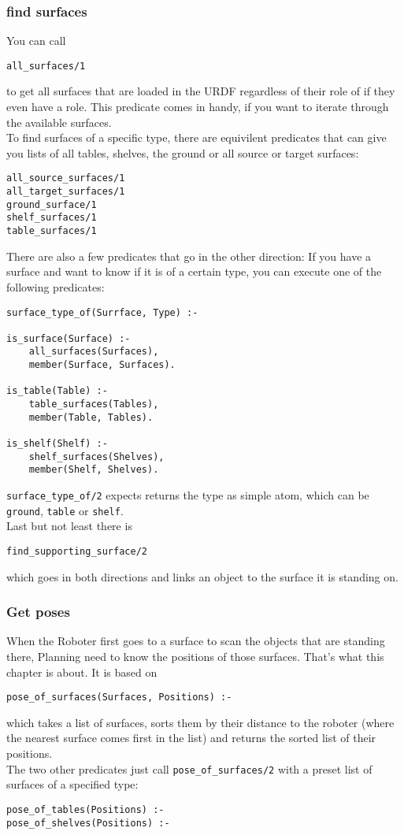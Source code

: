 \documentclass[main.tex]{subfiles}
\begin{document}
\subsubsection{find surfaces}

You can call
\begin{lstlisting}
all_surfaces/1
\end{lstlisting}
to get all surfaces that are loaded in the URDF regardless of their role of if they even have a role. This predicate comes in handy, if you want to iterate through the available surfaces.\\
To find surfaces of a specific type, there are equivilent predicates that can give you lists of all tables, shelves, the ground or all source or target surfaces:
\begin{lstlisting}
all_source_surfaces/1
all_target_surfaces/1
ground_surface/1
shelf_surfaces/1
table_surfaces/1
\end{lstlisting}

There are also a few predicates that go in the other direction: If you have a surface and want to know if it is of a certain type, you can execute one of the following predicates:
\begin{lstlisting}
surface_type_of(Surrface, Type) :-

is_surface(Surface) :-
    all_surfaces(Surfaces),
    member(Surface, Surfaces).

is_table(Table) :-
    table_surfaces(Tables),
    member(Table, Tables).

is_shelf(Shelf) :-
    shelf_surfaces(Shelves),
    member(Shelf, Shelves).
\end{lstlisting}
\texttt{surface\_type\_of/2} expects returns the type as simple atom, which can be \texttt{ground}, \texttt{table} or \texttt{shelf}.\\
Last but not least there is 
\begin{lstlisting}
find_supporting_surface/2
\end{lstlisting}
which goes in both directions and links an object to the surface it is standing on.

\subsubsection{Get poses}
When the Roboter first goes to a surface to scan the objects that are standing there, Planning need to know the positions of those surfaces. That's what this chapter is about. It is based on
\begin{lstlisting}
pose_of_surfaces(Surfaces, Positions) :-
\end{lstlisting}
which takes a list of surfaces, sorts them by their distance to the roboter (where the nearest surface comes first in the list) and returns the sorted list of their positions.\\
The two other predicates just call \texttt{pose\_of\_surfaces/2} with a preset list of surfaces of a specified type:
\begin{lstlisting}
pose_of_tables(Positions) :-
pose_of_shelves(Positions) :-
\end{lstlisting}
\end{document}
